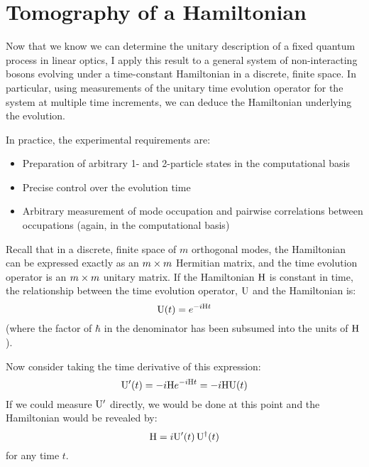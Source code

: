 \section{Tomography of a Hamiltonian}
\label{sec:Hamiltomo}
Now that we know we can determine the unitary description of a fixed quantum
process in linear optics, I apply this result to a general system of
non-interacting bosons evolving under a time-constant Hamiltonian in a discrete,
finite space. In particular, using measurements of the unitary time evolution
operator for the system at multiple time increments, we can deduce the
Hamiltonian underlying the evolution.

In practice, the experimental requirements are:
\begin{itemize}
  \item Preparation of arbitrary 1- and 2-particle states in the computational
  basis
  \item Precise control over the evolution time
  \item Arbitrary measurement of mode occupation and pairwise correlations
  between occupations (again, in the computational basis)
\end{itemize}

Recall that in a discrete, finite space of \(m\) orthogonal modes, the
Hamiltonian can be expressed exactly as an \(m \times m\) Hermitian matrix, and the
time evolution operator is an \(m \times m\) unitary matrix. If the Hamiltonian
\(\mathrm{H}\) is constant in time, the relationship between the time evolution
operator, \(\mathrm{U}\) and the Hamiltonian is:
\begin{equation}
  \label{eq:exponential}
  \mathrm{U} \!\left(t\right) = e^{-i \mathrm{H} t}
\end{equation}
(where the factor of \(\hbar\) in the denominator has been subsumed into the
units of \(\mathrm{H}\)).

Now consider taking the time derivative of this expression:
\begin{equation}
  \mathrm{U}^{\prime} \!\left(t\right) = -i \mathrm{H} e^{-i \mathrm{H} t} = -i \mathrm{H} \mathrm{U}
  \!\left(t\right)
\end{equation}
If we could measure \(\mathrm{U}^{\prime}\) directly, we would be done at this
point and the Hamiltonian would be revealed by:
\begin{equation}
  \mathrm{H} = i \mathrm{U}^{\prime} \!\left(t\right) \mathrm{U}^{\dagger} \!\left(t\right)
\end{equation}
for any time \(t\).

